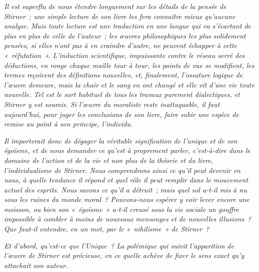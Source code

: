 \documentclass[french,twoside]{book} %
\begin{document}
\noindent \emph{Il est superflu de nous étendre longuement sur les détails de la pensée de Stirner ; une simple lecture de son livre les fera connaître mieux qu’aucune analyse. Mais toute lecture est une traduction en une langue qui va s’écartant de plus en plus de celle de l’auteur ; les œuvres philosophiques les plus solidement pensées, si elles n’ont pas à en craindre d’autre, ne peuvent échapper à cette « réfutation ». L’induction scientifique, impuissante contre le réseau serré des déductions, en ronge chaque maille tour à tour, les points de vue se modifient, les termes reçoivent des définitions nouvelles, et, finalement, l’ossature logique de l’œuvre demeure, mais la chair et le sang en ont changé et elle vit d’une vie toute nouvelle. Tel est le sort habituel de tous les travaux purement dialectiques, et Stirner y est soumis. Si l’œuvre du moraliste reste inattaquable, il faut aujourd’hui, pour juger les conclusions de son livre, faire subir une espèce de remise au point à son principe, l’individu}.\par
 \emph{Il importerait donc de dégager la véritable signification de l’unique et de son égoïsme, et de nous demander ce qu’\emph{est} à proprement parler, c’est-à-dire dans le domaine de l’action et de la vie et non plus de la théorie et du livre, l’individualisme de Stirner. Nous comprendrons ainsi ce qu’il peut devenir en nous, à quelle tendance il répond et quel rôle il peut remplir dans le mouvement actuel des esprits. Nous savons ce qu’il a détruit ; mais quel sol a-t-il mis à nu sous les ruines du monde moral ? Pouvons-nous espérer y voir lever encore une moisson, ou bien son « égoïsme » a-t-il creusé sous la vie sociale un gouffre impossible à combler à moins de nouveaux mensonges et de nouvelles illusions ? Que faut-il entendre, en un mot, par le « nihilisme » de Stirner ?}\par
\emph{Et d’abord, qu’est-ce que l’Unique ? La polémique qui suivit l’apparition de l’œuvre de Stirner est précieuse, en ce quelle achève de fixer le sens exact qu’y attachait son auteur.}\par
\end{document}
